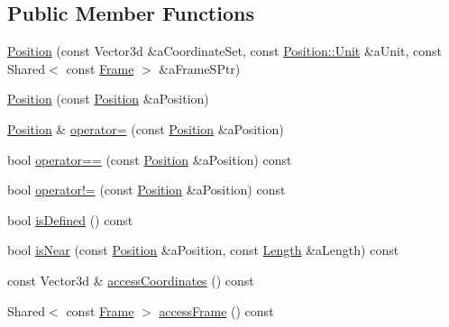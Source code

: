 \subsection*{Public Member Functions}
\begin{DoxyCompactItemize}
\item 
\hyperlink{classostk_1_1physics_1_1coord_1_1_position_a395cdb1415e49ae38dfef883fcc397d7}{Position} (const Vector3d \&a\+Coordinate\+Set, const \hyperlink{classostk_1_1physics_1_1units_1_1_length_a2664470a7eedf5d45c88861fe69badea}{Position\+::\+Unit} \&a\+Unit, const Shared$<$ const \hyperlink{classostk_1_1physics_1_1coord_1_1_frame}{Frame} $>$ \&a\+Frame\+S\+Ptr)
\item 
\hyperlink{classostk_1_1physics_1_1coord_1_1_position_a3de0cc8c3a8478760298fa63f1c23e5f}{Position} (const \hyperlink{classostk_1_1physics_1_1coord_1_1_position}{Position} \&a\+Position)
\item 
\hyperlink{classostk_1_1physics_1_1coord_1_1_position}{Position} \& \hyperlink{classostk_1_1physics_1_1coord_1_1_position_a8479aecc508b17a092dd606242bd271b}{operator=} (const \hyperlink{classostk_1_1physics_1_1coord_1_1_position}{Position} \&a\+Position)
\item 
bool \hyperlink{classostk_1_1physics_1_1coord_1_1_position_a5384658411f001cf57747382ab4fd461}{operator==} (const \hyperlink{classostk_1_1physics_1_1coord_1_1_position}{Position} \&a\+Position) const
\item 
bool \hyperlink{classostk_1_1physics_1_1coord_1_1_position_af1c3aef299ac63eac53a4b0fbffbc6fb}{operator!=} (const \hyperlink{classostk_1_1physics_1_1coord_1_1_position}{Position} \&a\+Position) const
\item 
bool \hyperlink{classostk_1_1physics_1_1coord_1_1_position_a969585edcf7795bbb6f4e62a10b2885b}{is\+Defined} () const
\item 
bool \hyperlink{classostk_1_1physics_1_1coord_1_1_position_a9ed9c1f90cb058db0e79bd648296c2b5}{is\+Near} (const \hyperlink{classostk_1_1physics_1_1coord_1_1_position}{Position} \&a\+Position, const \hyperlink{classostk_1_1physics_1_1units_1_1_length}{Length} \&a\+Length) const
\item 
const Vector3d \& \hyperlink{classostk_1_1physics_1_1coord_1_1_position_a47594258eb1f13649f3ba705a9a3d1e8}{access\+Coordinates} () const
\item 
Shared$<$ const \hyperlink{classostk_1_1physics_1_1coord_1_1_frame}{Frame} $>$ \hyperlink{classostk_1_1physics_1_1coord_1_1_position_a6d0b16ecc3e6d5f4f186985103b61fdb}{access\+Frame} () const

\end{DoxyCompactItemize}
